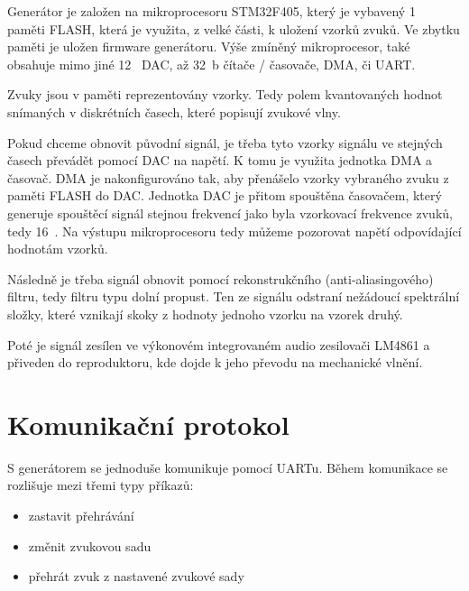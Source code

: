 Generátor je založen na mikroprocesoru STM32F405, který je vybavený 1~ paměti FLASH, která je využita, z velké části, k uložení vzorků zvuků. Ve zbytku paměti je uložen firmware generátoru. Výše zmíněný mikroprocesor, také obsahuje mimo jiné 12~ DAC, až 32\jedn~{b} čítače / časovače, DMA, či
UART.

Zvuky jsou v paměti reprezentovány vzorky. Tedy polem kvantovaných hodnot snímaných v diskrétních časech, které popisují zvukové vlny.

Pokud chceme obnovit původní signál, je třeba tyto vzorky signálu ve stejných časech převádět pomocí DAC na napětí. K tomu je využita jednotka DMA a časovač. DMA je nakonfigurováno tak, aby přenášelo vzorky vybraného zvuku z paměti FLASH do DAC. Jednotka DAC je přitom spouštěna časovačem, který generuje spouštěcí signál stejnou frekvencí jako byla vzorkovací frekvence zvuků, tedy 16~. Na výstupu mikroprocesoru tedy můžeme pozorovat napětí odpovídající hodnotám vzorků.

Následně je třeba signál obnovit pomocí rekonstrukčního (anti-aliasingového) filtru, tedy filtru typu dolní propust. Ten ze signálu odstraní nežádoucí spektrální složky, které vznikají skoky z hodnoty jednoho vzorku na vzorek druhý.

Poté je signál zesílen ve výkonovém integrovaném audio zesilovači LM4861 a přiveden do reproduktoru, kde dojde k jeho převodu na mechanické vlnění.

\section{Komunikační protokol}
S generátorem se jednoduše komunikuje pomocí UARTu. Během komunikace se rozlišuje mezi třemi typy příkazů:
\begin{itemize}
    \item zastavit přehrávání
    \item změnit zvukovou sadu
    \item přehrát zvuk z nastavené zvukové sady
\end{itemize}


